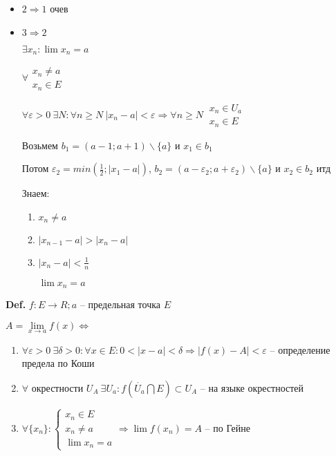 \documentclass[14pt, letter paper]{article}
\begin{document}
\begin{itemize}
    \item $2 \Rightarrow 1$ очев

    \item $3 \Rightarrow 2$

    $\exists x_n : \lim{x_n} = a$

    $\forall \begin{gathered}
        x_n \neq a \\
        x_n \in E
    \end{gathered}$

    $\forall \varepsilon > 0\ \exists N : \forall n \geq N\ |x_n - a| < \varepsilon \Rightarrow \forall n \geq N\ \begin{gathered}
        x_n \in U_a \\
        x_n \in E
    \end{gathered}$

    Возьмем $b_1 = (a-1; a+1)\backslash\{a\}$ и $x_1 \in b_1$

    Потом $\varepsilon_2 = min(\frac{1}{2}; |x_1 - a|)$, $b_2 = (a - \varepsilon_2; a + \varepsilon_2)\backslash\{a\}$ и $x_2 \in b_2$ итд

    Знаем:
    \begin{enumerate}
        \item $x_n \neq a$
        \item $|x_{n-1} - a| > |x_n - a|$
        \item $|x_n - a| < \frac{1}{n}$

        $\lim{x_n} = a$
    \end{enumerate}
\end{itemize}

\textbf{Def.} $f : E \rightarrow R; a$ -- предельная точка $E$

$A = \lim\limits_{x \rightarrow a}{f(x)} \Leftrightarrow$

\begin{enumerate}
    \item $\forall \varepsilon > 0\ \exists \delta > 0 : \forall x \in E : 0 < |x - a| < \delta \Rightarrow |f(x) - A| < \varepsilon$ -- определение предела по Коши

    \item $\forall$ окрестности $U_A\ \exists U_a : f(\mathring{U_a} \bigcap E) \subset U_A$ -- на языке окрестностей

    \item $\forall \{x_n\} : \begin{cases}
        x_n \in E \\
        x_n \neq a \\
        \lim{x_n} = a
    \end{cases} \Rightarrow \lim{f(x_n)} = A$ -- по Гейне
\end{enumerate}
\end{document}
